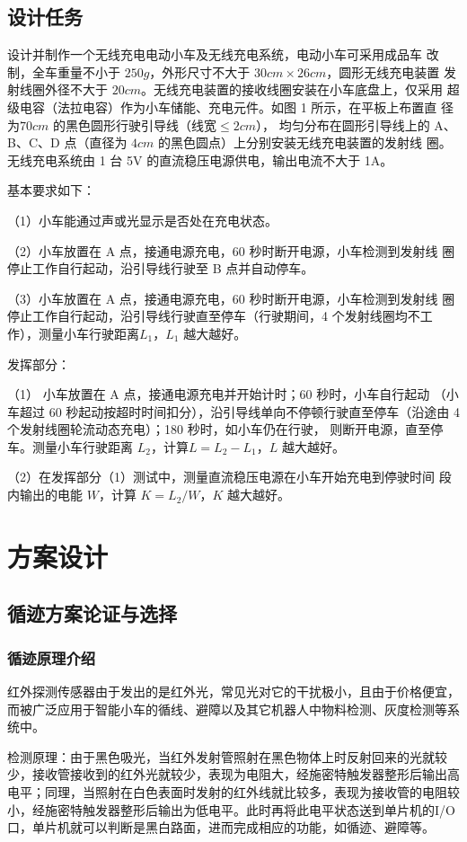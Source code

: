 \documentclass[UTF8]{ctexart}
\begin{document}
\subsection{设计任务}
设计并制作一个无线充电电动小车及无线充电系统，电动小车可采用成品车 改制，全车重量不小于 $ 250 g $，外形尺寸不大于 $ 30cm\times 26cm $，圆形无线充电装置 发射线圈外径不大于 $ 20cm $。无线充电装置的接收线圈安装在小车底盘上，仅采用 超级电容（法拉电容）作为小车储能、充电元件。如图 1 所示，在平板上布置直 径为$  70cm $ 的黑色圆形行驶引导线（线宽$ \leq 2cm $）， 均匀分布在圆形引导线上的 A、B、C、D 点（直径为 $ 4cm $ 的黑色圆点）上分别安装无线充电装置的发射线 圈。无线充电系统由 1 台 5V 的直流稳压电源供电，输出电流不大于 1A。 

基本要求如下：

（1）小车能通过声或光显示是否处在充电状态。

（2）小车放置在 A 点，接通电源充电，60 秒时断开电源，小车检测到发射线 圈停止工作自行起动，沿引导线行驶至 B 点并自动停车。

（3）小车放置在 A 点，接通电源充电，60 秒时断开电源，小车检测到发射线 圈停止工作自行起动，沿引导线行驶直至停车（行驶期间，4 个发射线圈均不工作），测量小车行驶距离$  L_1 $，$ L_1 $ 越大越好。 

发挥部分：

（1） 小车放置在 A 点，接通电源充电并开始计时；60 秒时，小车自行起动 （小车超过 60 秒起动按超时时间扣分），沿引导线单向不停顿行驶直至停车（沿途由 4 个发射线圈轮流动态充电）；180 秒时，如小车仍在行驶， 则断开电源，直至停车。测量小车行驶距离 $ L_2 $，计算$  L=L_2-L_1 $，$ L $ 越大越好。 

（2）在发挥部分（1）测试中，测量直流稳压电源在小车开始充电到停驶时间 段内输出的电能 $ W $，计算 $ K= L_2/W $，$ K $ 越大越好。 

\section{方案设计}
\subsection{循迹方案论证与选择}
\subsubsection{循迹原理介绍}
红外探测传感器由于发出的是红外光，常见光对它的干扰极小，且由于价格便宜，而被广泛应用于智能小车的循线、避障以及其它机器人中物料检测、灰度检测等系统中。

检测原理：由于黑色吸光，当红外发射管照射在黑色物体上时反射回来的光就较少，接收管接收到的红外光就较少，表现为电阻大，经施密特触发器整形后输出高电平；同理，当照射在白色表面时发射的红外线就比较多，表现为接收管的电阻较小，经施密特触发器整形后输出为低电平。此时再将此电平状态送到单片机的I/O口，单片机就可以判断是黑白路面，进而完成相应的功能，如循迹、避障等。
\end{document}

